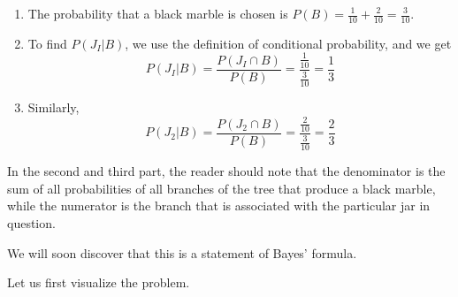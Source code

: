 \begin{solution}
\begin{center}
    \end{center}
    \begin{enumerate}
        \item The probability that a black marble is chosen is $P(B) = \frac{1}{10} + \frac{2}{10} = \frac{3}{10}$.
        \item To find $P(J_I | B)$, we use the definition of conditional probability, and we get
              \[
                  P(J_I | B) = \frac{P(J_I \cap B)}{P(B)} = \frac{\frac{1}{10}}{\frac{3}{10}} = \frac{1}{3}
              \]
        \item Similarly, \[P(J_2 | B) = \frac{P(J_2 \cap B)}{P(B)} = \frac{\frac{2}{10}}{\frac{3}{10}} = \frac{2}{3}
              \]
    \end{enumerate}


\end{solution}

In the second and third part, the reader should note that the denominator is the sum of all probabilities of all branches of the tree that produce a black marble, while the numerator is the branch that is associated with the particular jar in question.

We will soon discover that this is a statement of Bayes' formula.

Let us first visualize the problem.

